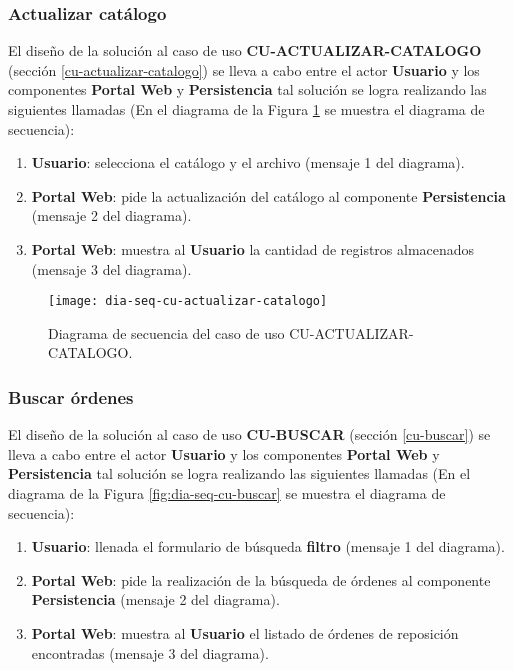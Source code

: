 \subsubsection{Actualizar catálogo}
El diseño de la solución al caso de uso \textbf{CU-ACTUALIZAR-CATALOGO} (sección \ref{cu-actualizar-catalogo}) se lleva a cabo entre el actor \textbf{Usuario} y los componentes \textbf{Portal Web} y \textbf{Persistencia} tal solución se logra realizando las siguientes llamadas (En el diagrama de la Figura \ref{fig:dia-seq-cu-actualizar-catalogo} se muestra el diagrama de secuencia):
\begin{enumerate}
	\item \textbf{Usuario}: selecciona el catálogo y el archivo (mensaje 1 del diagrama).
	\item \textbf{Portal Web}: pide la actualización del catálogo al componente \textbf{Persistencia} (mensaje 2 del diagrama).
	\item \textbf{Portal Web}: muestra al \textbf{Usuario} la cantidad de registros almacenados (mensaje 3 del diagrama).
\end{enumerate}

\begin{figure}[h]
	\centering
	\texttt{[image: dia-seq-cu-actualizar-catalogo]}
	\caption{Diagrama de secuencia del caso de uso CU-ACTUALIZAR-CATALOGO.}
	\label{fig:dia-seq-cu-actualizar-catalogo}
\end{figure}

\subsubsection{Buscar órdenes}
El diseño de la solución al caso de uso \textbf{CU-BUSCAR} (sección \ref{cu-buscar}) se lleva a cabo entre el actor \textbf{Usuario} y los componentes \textbf{Portal Web} y \textbf{Persistencia} tal solución se logra realizando las siguientes llamadas (En el diagrama de la Figura \ref{fig:dia-seq-cu-buscar} se muestra el diagrama de secuencia):
\begin{enumerate}
	\item \textbf{Usuario}: llenada el formulario de búsqueda \textbf{filtro} (mensaje 1 del diagrama).
	\item \textbf{Portal Web}: pide la realización de la búsqueda de órdenes al componente \textbf{Persistencia} (mensaje 2 del diagrama).
	\item \textbf{Portal Web}: muestra al \textbf{Usuario} el listado de órdenes de reposición encontradas (mensaje 3 del diagrama).
\end{enumerate}

